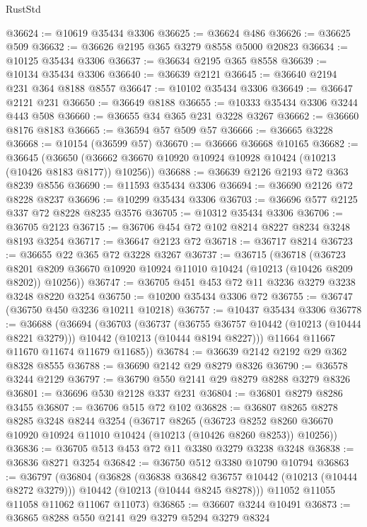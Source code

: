 \begin{lexlean}{RustStd}
\begin{coremodule}
@36624 := @10619 @35434 @3306
@36625 := @36624 @486
@36626 := @36625 @509
@36632 := @36626 @2195 @365 @3279 @8558 @5000 @20823
@36634 := @10125 @35434 @3306
@36637 := @36634 @2195 @365 @8558
@36639 := @10134 @35434 @3306
@36640 := @36639 @2121
@36645 := @36640 @2194 @231 @364 @8188 @8557
@36647 := @10102 @35434 @3306
@36649 := @36647 @2121 @231
@36650 := @36649 @8188
@36655 := @10333 @35434 @3306 @3244 @443 @508
@36660 := @36655 @34 @365 @231 @3228 @3267
@36662 := @36660 @8176 @8183
@36665 := @36594 @57 @509 @57
@36666 := @36665 @3228
@36668 := @10154 (@36599 @57)
@36670 := @36666 @36668 @10165
@36682 := @36645
    (@36650 (@36662 @36670 @10920 @10924 @10928 @10424 (@10213 (@10426 @8183 @8177)) @10256))
@36688 := @36639 @2126 @2193 @72 @363 @8239 @8556
@36690 := @11593 @35434 @3306
@36694 := @36690 @2126 @72 @8228 @8237
@36696 := @10299 @35434 @3306
@36703 := @36696 @577 @2125 @337 @72 @8228 @8235 @3576
@36705 := @10312 @35434 @3306
@36706 := @36705 @2123
@36715 := @36706 @454 @72 @102 @8214 @8227 @8234 @3248 @8193 @3254
@36717 := @36647 @2123 @72
@36718 := @36717 @8214
@36723 := @36655 @22 @365 @72 @3228 @3267
@36737 := @36715
    (@36718
      (@36723 @8201 @8209 @36670 @10920 @10924 @11010 @10424 (@10213 (@10426 @8209 @8202)) @10256))
@36747 := @36705 @451 @453 @72 @11 @3236 @3279 @3238 @3248 @8220 @3254
@36750 := @10200 @35434 @3306 @72
@36755 := @36747 (@36750 @450 @3236 @10211 @10218)
@36757 := @10437 @35434 @3306
@36778 := @36688
    (@36694
      (@36703
        (@36737
          (@36755 @36757 @10442 (@10213 (@10444 @8221 @3279)))
          @10442
          (@10213 (@10444 @8194 @8227)))
        @11664
        @11667
        @11670
        @11674
        @11679
        @11685))
@36784 := @36639 @2142 @2192 @29 @362 @8328 @8555
@36788 := @36690 @2142 @29 @8279 @8326
@36790 := @36578 @3244 @2129
@36797 := @36790 @550 @2141 @29 @8279 @8288 @3279 @8326
@36801 := @36696 @530 @2128 @337 @231
@36804 := @36801 @8279 @8286 @3455
@36807 := @36706 @515 @72 @102
@36828 := @36807
    @8265
    @8278
    @8285
    @3248
    @8244
    @3254
    (@36717
      @8265
      (@36723 @8252 @8260 @36670 @10920 @10924 @11010 @10424 (@10213 (@10426 @8260 @8253)) @10256))
@36836 := @36705 @513 @453 @72 @11 @3380 @3279 @3238 @3248
@36838 := @36836 @8271 @3254
@36842 := @36750 @512 @3380 @10790 @10794
@36863 := @36797
    (@36804
      (@36828
        (@36838 @36842 @36757 @10442 (@10213 (@10444 @8272 @3279)))
        @10442
        (@10213 (@10444 @8245 @8278)))
      @11052
      @11055
      @11058
      @11062
      @11067
      @11073)
@36865 := @36607 @3244 @10491
@36873 := @36865 @8288 @550 @2141 @29 @3279 @5294 @3279 @8324

\end{coremodule}
\end{lexlean}
